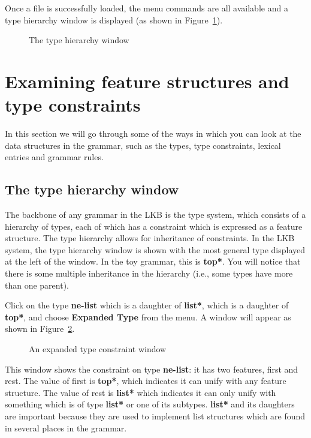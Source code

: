 \documentclass[12pt]{report}
\begin{document}
Once a file is successfully loaded, the menu commands are all available
and a type hierarchy window is displayed (as shown in Figure~\ref{typehier}).
\begin{figure}
\epsfxsize=3in
\caption{The type hierarchy window}
\label{typehier}
\end{figure}


\section{Examining feature structures and type constraints}

In this section we will go through some of the ways in which
you can look at the data structures in the grammar, such as the types,
type constraints,
lexical entries and grammar rules.

\subsection{The type hierarchy window}
The backbone of any grammar in the LKB is the type system,
which consists of a hierarchy of types, each of which has a
constraint which is expressed as a feature structure.
The type hierarchy allows for inheritance of constraints.
In the LKB system, the type hierarchy window is shown 
with the most
general type displayed at the left of the window.  In the toy grammar, 
this is {\bf *top*}.  
You will notice that there is some multiple inheritance in the hierarchy
(i.e., some types have more than one parent).

Click on the type {\bf ne-list}
which is a daughter of {\bf *list*}, which is a daughter of {\bf *top*},
and choose {\bf Expanded Type} from the menu.  A window will appear
as shown in Figure~\ref{ne-list}.
\begin{figure}
\epsfxsize=1in
\caption{An expanded type constraint window}
\label{ne-list}
\end{figure}
This window shows the constraint on type {\bf ne-list}: it has
two features, {\sc first} and {\sc rest}.  The value of
{\sc first} is {\bf *top*}, which indicates it can unify with any
feature structure.  The value of {\sc rest} is {\bf *list*}
which indicates it can only unify with something which is
of type {\bf *list*} or one of its subtypes.  {\bf *list*} and 
its daughters are important because they are used to implement
list structures which are found in several places in the grammar.
\end{document}
